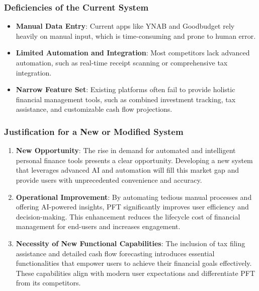 \subsubsection{Deficiencies of the Current System}
\begin{itemize}
    \item \textbf{Manual Data Entry}: Current apps like YNAB and Goodbudget rely heavily on manual input, which is time-consuming and prone to human error.
    \item \textbf{Limited Automation and Integration}: Most competitors lack advanced automation, such as real-time receipt scanning or comprehensive tax integration.
    \item \textbf{Narrow Feature Set}: Existing platforms often fail to provide holistic financial management tools, such as combined investment tracking, tax assistance, and customizable cash flow projections.
\end{itemize}

\subsubsection{Justification for a New or Modified System}
\begin{enumerate}
    \item \textbf{New Opportunity}: The rise in demand for automated and intelligent personal finance tools presents a clear opportunity. Developing a new system that leverages advanced AI and automation will fill this market gap and provide users with unprecedented convenience and accuracy.
    \item \textbf{Operational Improvement}: By automating tedious manual processes and offering AI-powered insights, PFT significantly improves user efficiency and decision-making. This enhancement reduces the lifecycle cost of financial management for end-users and increases engagement.
    \item \textbf{Necessity of New Functional Capabilities}: The inclusion of tax filing assistance and detailed cash flow forecasting introduces essential functionalities that empower users to achieve their financial goals effectively. These capabilities align with modern user expectations and differentiate PFT from its competitors.
\end{enumerate}



